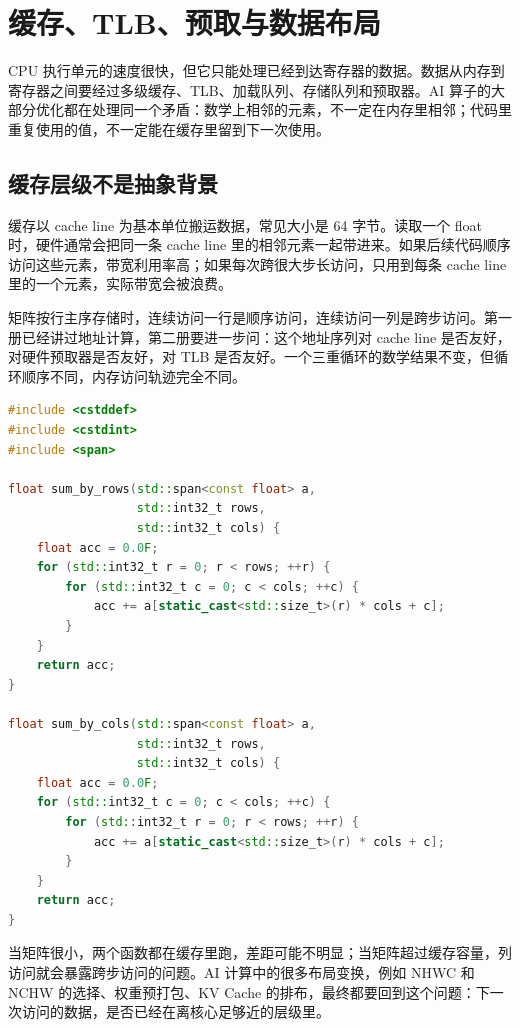 \chapter{缓存、TLB、预取与数据布局}

CPU 执行单元的速度很快，但它只能处理已经到达寄存器的数据。数据从内存到寄存器之间要经过多级缓存、TLB、加载队列、存储队列和预取器。AI 算子的大部分优化都在处理同一个矛盾：数学上相邻的元素，不一定在内存里相邻；代码里重复使用的值，不一定能在缓存里留到下一次使用。

\section{缓存层级不是抽象背景}

缓存以 cache line 为基本单位搬运数据，常见大小是 64 字节。读取一个 float 时，硬件通常会把同一条 cache line 里的相邻元素一起带进来。如果后续代码顺序访问这些元素，带宽利用率高；如果每次跨很大步长访问，只用到每条 cache line 里的一个元素，实际带宽会被浪费。

矩阵按行主序存储时，连续访问一行是顺序访问，连续访问一列是跨步访问。第一册已经讲过地址计算，第二册要进一步问：这个地址序列对 cache line 是否友好，对硬件预取器是否友好，对 TLB 是否友好。一个三重循环的数学结果不变，但循环顺序不同，内存访问轨迹完全不同。

\begin{lstlisting}[language=C++,caption={同一个矩阵，行访问和列访问的内存轨迹不同}]
#include <cstddef>
#include <cstdint>
#include <span>

float sum_by_rows(std::span<const float> a,
                  std::int32_t rows,
                  std::int32_t cols) {
    float acc = 0.0F;
    for (std::int32_t r = 0; r < rows; ++r) {
        for (std::int32_t c = 0; c < cols; ++c) {
            acc += a[static_cast<std::size_t>(r) * cols + c];
        }
    }
    return acc;
}

float sum_by_cols(std::span<const float> a,
                  std::int32_t rows,
                  std::int32_t cols) {
    float acc = 0.0F;
    for (std::int32_t c = 0; c < cols; ++c) {
        for (std::int32_t r = 0; r < rows; ++r) {
            acc += a[static_cast<std::size_t>(r) * cols + c];
        }
    }
    return acc;
}
\end{lstlisting}

当矩阵很小，两个函数都在缓存里跑，差距可能不明显；当矩阵超过缓存容量，列访问就会暴露跨步访问的问题。AI 计算中的很多布局变换，例如 NHWC 和 NCHW 的选择、权重预打包、KV Cache 的排布，最终都要回到这个问题：下一次访问的数据，是否已经在离核心足够近的层级里。

